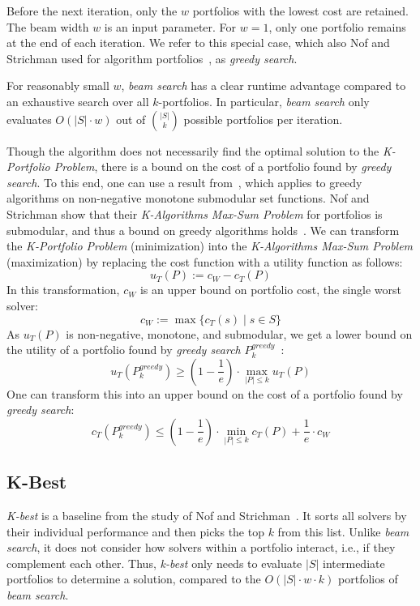\documentclass[a4paper,USenglish,pdfa]{lipics-v2021} %
\begin{document}
Before the next iteration, only the $w$ portfolios with the lowest cost are retained.
The beam width $w$ is an input parameter.
For $w=1$, only one portfolio remains at the end of each iteration.
We refer to this special case, which also Nof and Strichman used for algorithm portfolios~\cite{nof2020real}, as \emph{greedy search}.

For reasonably small $w$, \emph{beam search} has a clear runtime advantage compared to an exhaustive search over all $k$-portfolios.
In particular, \emph{beam search} only evaluates $O(|S| \cdot w)$ out of $\binom{|S|}{k}$ possible portfolios per iteration.

Though the algorithm does not necessarily find the optimal solution to the \emph{K-Portfolio Problem}, there is a bound on the cost of a portfolio found by \emph{greedy search}. 
To this end, one can use a result from~\cite{nemhauser1978analysis}, which applies to greedy algorithms on non-negative monotone submodular set functions.
Nof and Strichman show that their \emph{K-Algorithms Max-Sum Problem} for portfolios is submodular, and thus a bound on greedy algorithms holds~\cite{nof2020real}. 
We can transform the \emph{K-Portfolio Problem} (minimization) into the \emph{K-Algorithms Max-Sum Problem} (maximization) by replacing the cost function with a utility function as follows:%
\[
u_{T}(P) := c_W - c_{T}(P)
\]
In this transformation, $c_W$ is an upper bound on portfolio cost, the single worst solver:%
\[
c_W := \max\{c_T(s) \mid s \in S\}
\]
As $u_{T}(P)$ is non-negative, monotone, and submodular, we get a lower bound on the utility of a portfolio found by \emph{greedy search} $P_k^{greedy}$~\cite{nemhauser1978analysis,krause2014submodular}:%
\[
	u_{T}(P_k^{greedy}) \geq (1 - \frac{1}{e}) \cdot \max_{|P| \leq k}{u_{T}(P)}
\]
One can transform this into an upper bound on the cost of a portfolio found by \emph{greedy search}:%
\begin{equation}
	c_{T}(P_k^{greedy}) \leq (1 - \frac{1}{e}) \cdot \min_{|P| \leq k}{c_{T}(P)} + \frac{1}{e} \cdot c_W
	\label{eq:upper-bound}
\end{equation}

\subsection{K-Best}
\label{sec:approach:k-best}

\emph{K-best} is a baseline from the study of Nof and Strichman~\cite{nof2020real}. 
It sorts all solvers by their individual performance and then picks the top $k$ from this list.
Unlike \emph{beam search}, it does not consider how solvers within a portfolio interact, i.e., if they complement each other.
Thus, \emph{k-best} only needs to evaluate $|S|$ intermediate portfolios to determine a solution, compared to the $O(|S| \cdot w \cdot k)$ portfolios of \emph{beam search}.
\end{document}
